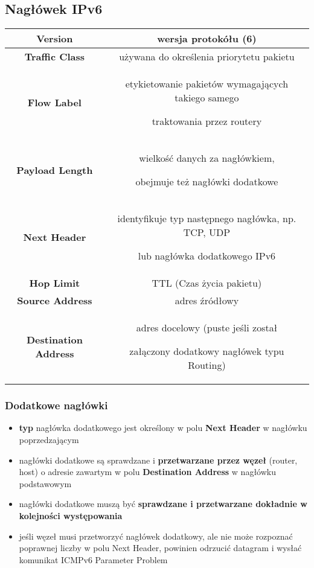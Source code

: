 \documentclass[../main.tex]{subfiles}
\begin{document}
    \subsection{Nagłówek IPv6}
    \begin{tabular}{|c|c|}
        \hline
        \textbf{Version} &
        wersja protokółu (6)\\
        \hline
        \textbf{Traffic Class} &
        używana do określenia priorytetu pakietu\\
        \hline

        \textbf{Flow Label} &
        etykietowanie pakietów wymagających takiego samego

        traktowania przez routery\\
        \hline

        \textbf{Payload Length} &
        wielkość danych za nagłówkiem,

        obejmuje też nagłówki dodatkowe\\
        \hline

        \textbf{Next Header} &
        identyfikuje typ następnego nagłówka, np. TCP, UDP

        lub nagłówka dodatkowego IPv6\\
        \hline

        \textbf{Hop Limit} &
        TTL (Czas życia pakietu)\\
        \hline

        \textbf{Source Address} &
        adres źródłowy\\
        \hline

        \textbf{Destination Address} &
        adres docelowy (puste jeśli został

        załączony dodatkowy nagłówek typu Routing)\\
        \hline
    \end{tabular}


    \subsubsection{Dodatkowe nagłówki}
    \begin{itemize}
        \item \textbf{typ} nagłówka dodatkowego jest określony w polu \textbf{Next Header} w nagłówku poprzedzającym
        \item nagłówki dodatkowe są sprawdzane i \textbf{przetwarzane przez węzeł} (router, host) o adresie zawartym w polu \textbf{Destination Address} w nagłówku podstawowym
        \item nagłówki dodatkowe muszą być \textbf{sprawdzane i przetwarzane dokładnie w kolejności występowania}
        \item jeśli węzeł musi przetworzyć nagłówek dodatkowy, ale nie może rozpoznać poprawnej liczby w polu Next Header, powinien odrzucić datagram i wysłać komunikat ICMPv6 Parameter Problem
    \end{itemize}
\end{document}
